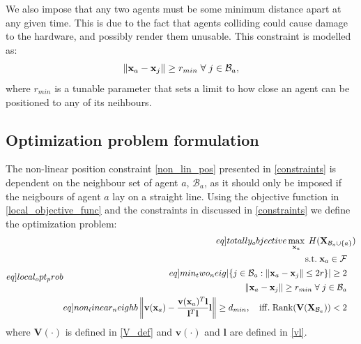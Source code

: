 We also impose that any two agents must be some minimum distance apart at any given time. This is due to the fact that agents colliding could cause damage to the hardware, and possibly render them unusable.
This constraint is modelled as:
\begin{equation}
  \left\lVert\mathbf{x}_{a} - \mathbf{x}_{j}\right\rVert \geq r_{min} \;\forall\;j\in\mathcal{B}_{a},
\end{equation}
where $r_{min}$ is a tunable parameter that sets a limit to how close an agent can be positioned to any of its neihbours.\clearpage
\subsection{Optimization problem formulation}
The non-linear position constraint \eqref{non_lin_pos} presented in \ref{constraints} is dependent on the neighbour set of agent $a$, $\mathcal{B}_{a}$, as it should only be imposed if the 
neigbours of agent $a$ lay on a straight line. Using the objective function in \eqref{local_objective_func} and the constraints in discussed in \ref{constraints} we define the optimization problem:
\begin{subequations}\label[eq]{local_opt_prob}
  \begin{align}
    \begin{split}\label[eq]{totally_objective}
      &\max_{\mathbf{x}_{a}}\;H(\mathbf{X}_{\mathcal{B}_{a}\cup\{a\}})\\
    \end{split}\\
    \mathrm{s.t.}\;
    \begin{split}
      &\mathbf{x}_{a}\in\mathcal{F}
    \end{split}\\
    \begin{split}\label[eq]{min_two_neig}
      &|\{j\in\mathcal{B}_{a}: \norm{\mathbf{x}_{a} - \mathbf{x}_{j}} \leq 2r\}|\geq 2
    \end{split}\\
    \begin{split}
      &\norm{\mathbf{x}_{a} - \mathbf{x}_{j}} \geq r_{min}\;\forall\;j\in\mathcal{B}_{a}
    \end{split}\\
    \begin{split}\label[eq]{non_linear_neighb}
      &\norm{\mathbf{v}(\mathbf{x}_{a}) - \frac{\mathbf{v}(\mathbf{x}_{a})^{T}\mathbf{l}}{\mathbf{l}^{T}\mathbf{l}}\mathbf{l}}\geq d_{min},\quad\mathrm{iff.}\;\mathrm{Rank}(\mathbf{V}(\mathbf{X}_{\mathcal{B}_{a}}))<2
    \end{split}
\end{align}
\end{subequations}
where $\mathbf{V}(\cdot)$ is defined in \eqref{V_def} and $\mathbf{v}(\cdot)$ and $\mathbf{l}$ are defined in \eqref{vl}.

